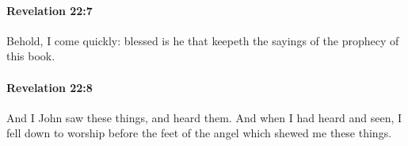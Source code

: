 		\paragraph{Revelation 22:7} %
			\label{REVELATIONNT-22-7}

			Behold, I come quickly: blessed is he that keepeth the sayings of the prophecy of this book.

			\begin{framed}
			\scriptsize
				\begin{compactdesc}
					\item[SBLG] 
				\end{compactdesc}
			\end{framed}

		\paragraph{Revelation 22:8} %
			\label{REVELATIONNT-22-8}

			And I John saw these things, and heard them. And when I had heard and seen, I fell down to worship before the feet of the angel which shewed me these things.

